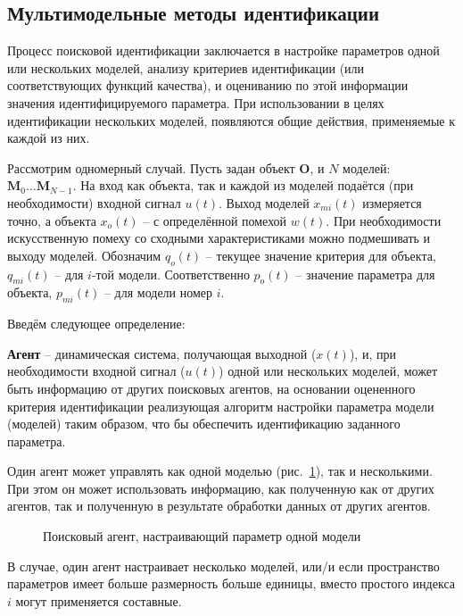 \documentclass[a4paper,paratype,12pt,fouriernc]{cmonogra}
\begin{document}
\subsection*{Мультимодельные методы идентификации}

Процесс поисковой идентификации заключается в настройке параметров одной
или нескольких моделей, анализу критериев идентификации
(или соответствующих функций качества), и оцениванию по этой информации
значения идентифицируемого параметра. При использовании в целях идентификации нескольких моделей,
появляются общие действия, применяемые к каждой из них.

Рассмотрим одномерный случай.
Пусть задан объект $ \mathbf{O} $, и $N$ моделей:
$ \mathbf{M}_0 \ldots \mathbf{M}_{N-1} $.
На вход как объекта, так и каждой из моделей подаётся (при необходимости)
входной сигнал $u(t)$. Выход моделей $x_{mi}(t)$ измеряется точно,
а объекта $x_o(t)$ -- с определённой помехой $w(t)$. При необходимости искусственную помеху
со сходными характеристиками можно подмешивать и выходу моделей.
Обозначим $q_o(t)$ -- текущее значение критерия для
объекта, $q_{mi}(t)$ -- для $i$-той модели.
Соответственно $p_o(t)$ -- значение параметра для объекта,
$p_{mi}(t)$ -- для модели номер $i$.


Введём следующее определение:


\textbf{ Агент } -- динамическая система, получающая выходной ($x(t)$),
и, при необходимости входной сигнал ($u(t)$) одной или нескольких моделей,
может быть информацию от других поисковых агентов,
на основании оцененного критерия идентификации
реализующая алгоритм настройки параметра модели (моделей)
таким образом, что бы обеспечить идентификацию заданного параметра.

Один агент может управлять как одной моделью (рис.~\ref{atu:f:agent1}),
так и несколькими. При этом
он может использовать информацию, как полученную как от других
агентов, так и полученную в результате обработки данных от других агентов.

\begin{figure}[htb!]
\begin{center}

\end{center}
\caption{Поисковый агент, настраивающий параметр одной модели}
\label{atu:f:agent1}
\end{figure}


В случае, один агент настраивает несколько моделей,
или/и если пространство параметров имеет больше размерность больше единицы,
вместо простого индекса $i$ могут применяется составные.
\end{document}
